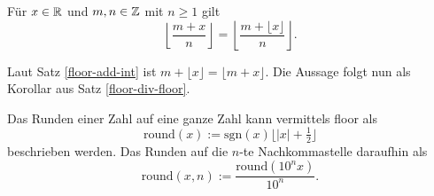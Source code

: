 \begin{Satz}
Für $x\in\mathbb R$ und $m,n\in\mathbb Z$ mit $n\ge 1$ gilt
\[\left\lfloor\frac{m+x}{n}\right\rfloor
= \left\lfloor\frac{m+\lfloor x\rfloor}{n}\right\rfloor.\]
\end{Satz}
\begin{Beweis}
Laut Satz \ref{floor-add-int} ist $m+\lfloor x\rfloor = \lfloor m+x\rfloor$.
Die Aussage folgt nun als Korollar aus Satz \ref{floor-div-floor}.\,\qedsymbol
\end{Beweis}

\noindent
Das Runden einer Zahl auf eine ganze Zahl kann vermittels floor als
\[\mathrm{round}(x) := \mathrm{sgn}(x)\lfloor |x|+\tfrac{1}{2}\rfloor\]
beschrieben werden. Das Runden auf die $n$-te Nachkommastelle daraufhin als
\[\mathrm{round}(x, n) := \frac{\mathrm{round}(10^n x)}{10^n}.\]
